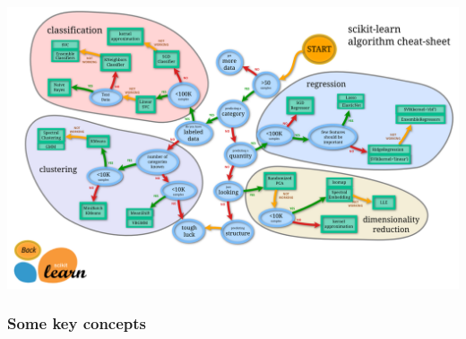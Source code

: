 \begin{frame}
\frametitle{}
\includegraphics[width=\textwidth]{sklearn_material/ml_map.png}
% 
\end{frame}


\begin{frame}
\frametitle{Some key concepts}

\end{frame}



